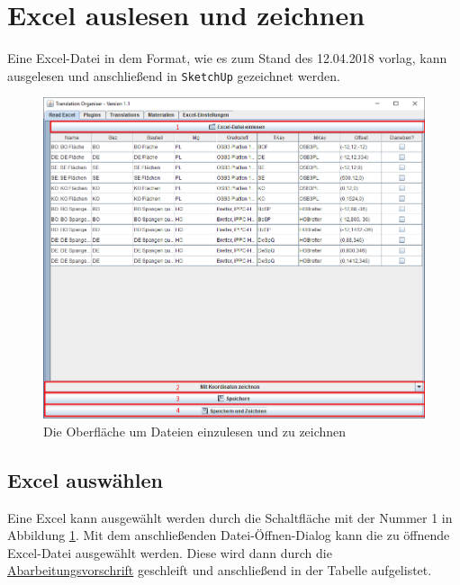 \documentclass{book}
\newcommand{\sketchup}{\texttt{SketchUp}\xspace}
\begin{document}
		\section{Excel auslesen und zeichnen}\label{excelread}
			Eine Excel-Datei in dem Format, wie es zum Stand des 12.04.2018 vorlag, kann ausgelesen und anschließend in \sketchup gezeichnet werden.
			\begin{figure}
				\centering
				\includegraphics[scale=0.48]{pics/assisttool/readExcel.png}
				\caption{Die Oberfläche um Dateien einzulesen und zu zeichnen}
				\label{fig:read Excel}
			\end{figure}
			\subsection{Excel auswählen}
				Eine Excel kann ausgewählt werden durch die Schaltfläche mit der Nummer 1 in Abbildung \ref{fig:read Excel}. Mit dem anschließenden Datei-Öffnen-Dialog kann die zu öffnende Excel-Datei ausgewählt werden. Diese wird dann durch die \hyperref[REC - Ablauf]{Abarbeitungsvorschrift} geschleift und anschließend in der Tabelle aufgelistet. 
\end{document}
